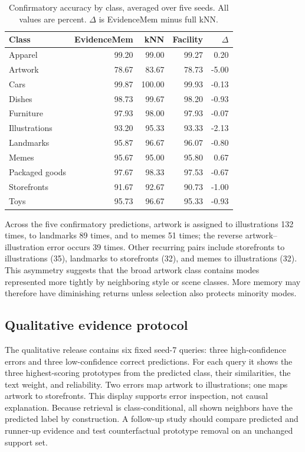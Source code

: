 \documentclass[10pt,twocolumn]{article}
\newcommand{\method}{EvidenceMem}
\begin{document}
\begin{table}[t]
\centering
\caption{Confirmatory accuracy by class, averaged over five seeds. All values are
percent. $\Delta$ is \method{} minus full kNN.}
\label{tab:per-class}
\scriptsize
\setlength{\tabcolsep}{3.0pt}
\begin{tabular}{lrrrr}
\toprule
Class & \method{} & kNN & Facility & $\Delta$ \\
\midrule
Apparel        & 99.20 & 99.00 & 99.27 &  0.20 \\
Artwork        & 78.67 & 83.67 & 78.73 & -5.00 \\
Cars           & 99.87 &100.00 & 99.93 & -0.13 \\
Dishes         & 98.73 & 99.67 & 98.20 & -0.93 \\
Furniture      & 97.93 & 98.00 & 97.93 & -0.07 \\
Illustrations  & 93.20 & 95.33 & 93.33 & -2.13 \\
Landmarks      & 95.87 & 96.67 & 96.07 & -0.80 \\
Memes          & 95.67 & 95.00 & 95.80 &  0.67 \\
Packaged goods & 97.67 & 98.33 & 97.53 & -0.67 \\
Storefronts    & 91.67 & 92.67 & 90.73 & -1.00 \\
Toys           & 95.73 & 96.67 & 95.33 & -0.93 \\
\bottomrule
\end{tabular}
\end{table}

Across the five confirmatory predictions, artwork is assigned to illustrations 132
times, to landmarks 89 times, and to memes 51 times; the reverse artwork--illustration
error occurs 39 times. Other recurring pairs include storefronts to illustrations (35),
landmarks to storefronts (32), and memes to illustrations (32). This asymmetry suggests
that the broad artwork class contains modes represented more tightly by neighboring
style or scene classes. More memory may therefore have diminishing returns unless
selection also protects minority modes.

\subsection{Qualitative evidence protocol}

The qualitative release contains six fixed seed-7 queries: three high-confidence errors
and three low-confidence correct predictions. For each query it shows the three
highest-scoring prototypes from the predicted class, their similarities, the text
weight, and reliability. Two errors map artwork to illustrations; one maps artwork to
storefronts. This display supports error inspection, not causal explanation. Because
retrieval is class-conditional, all shown neighbors have the predicted label by
construction. A follow-up study should compare predicted and runner-up evidence and
test counterfactual prototype removal on an unchanged support set.
\end{document}
